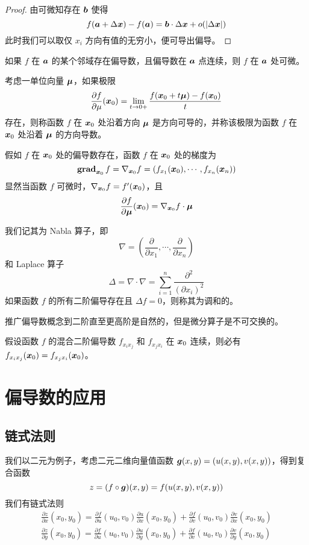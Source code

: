 \begin{proof}
	由可微知存在 $\boldsymbol{b}$ 使得
	\[ f(\boldsymbol{a} + \Delta \boldsymbol{x}) - f(\boldsymbol{a}) = \boldsymbol{b} \cdot \Delta \boldsymbol{x} + o(|\Delta \boldsymbol{x}|) \]
	此时我们可以取仅 $x_i$ 方向有值的无穷小，便可导出偏导。
\end{proof}

\begin{theorem}
	如果 $f$ 在 $\boldsymbol{a}$ 的某个邻域存在偏导数，且偏导数在 $\boldsymbol{a}$ 点连续，则 $f$ 在 $\boldsymbol{a}$ 处可微。
\end{theorem}

考虑一单位向量 $\boldsymbol{\mu}$，如果极限
\[ \frac{\partial f}{\partial \mu}(\boldsymbol{x}_0) = \lim_{t \to 0+} \frac{f(\boldsymbol{x}_0 + t \boldsymbol{\mu}) - f(\boldsymbol{x}_0)}{t} \]
存在，则称函数 $f$ 在 $\boldsymbol{x}_0$ 处沿着方向 $\boldsymbol{\mu}$ 是方向可导的，并称该极限为函数 $f$ 在 $\boldsymbol{x}_0$ 处沿着 $\boldsymbol{\mu}$ 的方向导数。

假如 $f$ 在 $\boldsymbol{x}_0$ 处的偏导数存在，函数 $f$ 在 $\boldsymbol{x}_0$ 处的梯度为
\[ \operatorname{\mathbf{grad}}_{\boldsymbol{x}_0} f = \nabla_{\boldsymbol{x}_0} f = \left( f_{x_1}(\boldsymbol{x}_0), \cdots, f_{x_n}(\boldsymbol{x}_n) \right) \]
显然当函数 $f$ 可微时，$\nabla_{\boldsymbol{x}_0} f = f'(\boldsymbol{x}_0)$，且
\[ \frac{\partial f}{\partial \boldsymbol{\mu}} (\boldsymbol{x}_0) = \nabla_{\boldsymbol{x}_0} f \cdot \boldsymbol{\mu} \]

我们记其为 Nabla 算子，即
\[ \nabla = \left( \frac{\partial}{\partial x_1}, \cdots, \frac{\partial}{\partial x_n} \right) \]
和 Laplace 算子
\[ \Delta = \nabla \cdot \nabla = \sum_{i=1}^{n} \frac{\partial^2}{(\partial x_i)^2} \]
如果函数 $f$ 的所有二阶偏导存在且 $\Delta f = 0$，则称其为调和的。

推广偏导数概念到二阶直至更高阶是自然的，但是微分算子是不可交换的。

\begin{theorem}
	假设函数 $f$ 的混合二阶偏导数 $f_{x_i x_j}$ 和 $f_{x_j x_i}$ 在 $\boldsymbol{x}_0$ 连续，则必有 $f_{x_i x_j}(\boldsymbol{x}_0) = f_{x_j x_i}(\boldsymbol{x}_0)$。
\end{theorem}

\section{偏导数的应用}

\subsection{链式法则}

我们以二元为例子，考虑二元二维向量值函数 $\boldsymbol{g}(x, y) = (u(x, y), v(x, y))$，得到复合函数
\[ z = (f \circ \boldsymbol{g})(x, y) = f(u(x, y), v(x, y)) \]
我们有链式法则
\[ \begin{aligned}
	\frac{\partial z}{\partial x}(x_0, y_0) = \frac{\partial f}{\partial u}(u_0, v_0) \frac{\partial u}{\partial x}(x_0, y_0) + \frac{\partial f}{\partial v}(u_0, v_0)\frac{\partial v}{\partial x}(x_0, y_0) \\
	\frac{\partial z}{\partial y}(x_0, y_0) = \frac{\partial f}{\partial u}(u_0, v_0) \frac{\partial u}{\partial y}(x_0, y_0) + \frac{\partial f}{\partial v}(u_0, v_0)\frac{\partial v}{\partial y}(x_0, y_0)
\end{aligned} \]

